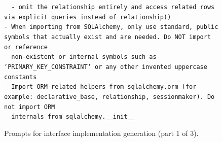 \begin{figure}[p]
{\begin{minipage}{0.97\textwidth}
        \texttt{~~- omit the relationship entirely and access related rows via explicit queries instead of relationship()}\\
        \texttt{- When importing from SQLAlchemy, only use standard, public symbols that actually exist and are needed. Do NOT import or reference}\\
        \texttt{~~non-existent or internal symbols such as `PRIMARY\_KEY\_CONSTRAINT` or any other invented uppercase constants}\\
        \texttt{- Import ORM-related helpers from sqlalchemy.orm (for example: declarative\_base, relationship, sessionmaker). Do not import ORM}\\
        \texttt{~~internals from sqlalchemy.\_\_init\_\_}

        \vspace{1pt}
        \end{minipage}
    }
    \captionsetup{labelformat=default, name=Figure}
    \caption{Prompts for interface implementation generation (part 1 of 3).}
    \label{fig:gen-env-1}
\end{figure}
